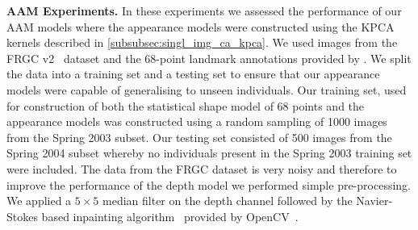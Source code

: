 \textbf{AAM Experiments.} In these experiments we assessed the performance
of our AAM models where the appearance models were constructed using the KPCA
kernels described in \cref{subsubsec:singl_img_ca_kpca}. We used images from
the FRGC v2~\cite{phillips2005overview} dataset and the 68-point landmark
annotations provided by \citet{sagonas2013semi}. We split the data into
a training set and a testing set to ensure that our appearance models
were capable of generalising to unseen individuals. Our training set, used
for construction of both the statistical shape model of 68 points and the
appearance models was constructed using a random sampling of 1000 images
from the Spring 2003 subset. Our testing set consisted of 500 images from the
Spring 2004 subset whereby no individuals present in the Spring 2003 training
set were included. The data from the FRGC dataset is very noisy and therefore
to improve the performance of the depth model we performed simple pre-processing.
We applied a $5\times5$ median filter on the depth channel followed by
the Navier-Stokes based inpainting algorithm~\cite{bertalmio2001navier} provided
by OpenCV~\cite{opencv_library}.

